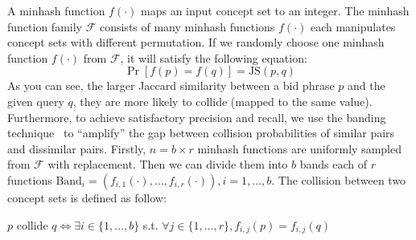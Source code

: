 A minhash function $f(\cdot)$ maps an input concept set to an integer.  The minhash function family
$\mathcal{F}$ consists of many minhash functions
$f(\cdot)$ each manipulates concept sets with different permutation. 
If we randomly choose one minhash function $f(\cdot)$ from
$\mathcal{F}$, it will satisfy the following equation:
\begin{equation}
\label{eqn:minhash}
\Pr[f(p)=f(q)]=\text{JS}(p,q)
\end{equation}
As you can see, the larger Jaccard similarity between a bid phrase $p$ and the
given query $q$, they are more likely to collide (mapped to the same value).
Furthermore, to achieve satisfactory precision and recall, we use the banding
technique~\cite{raja:massivedatasets} to ``amplify'' the gap between 
collision probabilities of similar pairs and dissimilar pairs.
Firstly, $n=b\times{}r$ minhash functions are uniformly sampled from $\mathcal{F}$ with
replacement. 
Then we can divide them into $b$ bands each of $r$ functions 
$\text{Band}_{i}=(f_{i,1}(\cdot),\ldots,f_{i,r}(\cdot)),i=1,\ldots,b$.
The collision %
between two concept sets is defined as follow:
\begin{definition}
\label{def:col}
$p\text{ collide }q\Leftrightarrow{}\exists{}i\in\{1,\ldots,b\}$ s.t.
$\forall{}j\in\{1,\ldots,r\},f_{i,j}(p)=f_{i,j}(q)$
\end{definition}
